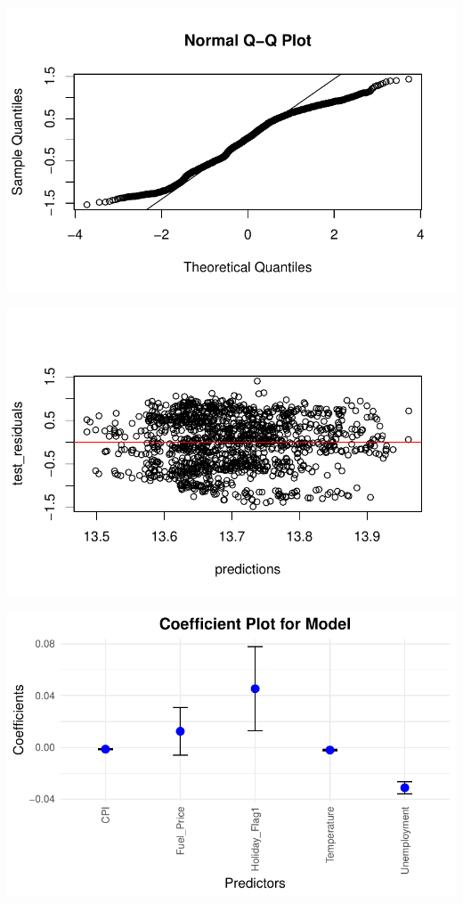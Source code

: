 \documentclass[
  letterpaper,
  DIV=11,
  numbers=noendperiod]{scrartcl}
\begin{document}
\includegraphics{678final_files/figure-pdf/unnamed-chunk-6-1.pdf}

\includegraphics{678final_files/figure-pdf/unnamed-chunk-6-2.pdf}

\includegraphics{678final_files/figure-pdf/unnamed-chunk-6-3.pdf}
\end{document}
